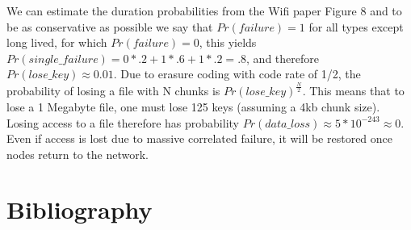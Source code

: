 \documentclass[a4paper,10pt]{article}
\begin{document}
We can estimate the duration probabilities from the Wifi paper Figure 8 
\cite{wifi} and to be as conservative as possible we say that $Pr(failure)=1$ 
for all types except long lived, for which $Pr(failure)=0$, this yields 
$Pr(single\_failure)= 0*.2 + 1*.6 + 1*.2 = .8$, and 
therefore $Pr(lose\_key) \approx 0.01$.  Due to erasure coding with code rate 
of 1/2, the probability of losing a file with N chunks is 
$Pr(lose\_key)^{\frac{N}{2}}$. 
This means that to lose a 1 Megabyte file, one must lose 125 keys (assuming a 
4kb chunk size). Losing access to a file therefore has probability 
$Pr(data\_loss) \approx 5*10^{-243} \approx 0$.  Even if access is lost due to 
massive correlated failure, it will be restored once nodes return to the 
network.

\pagebreak
\section{Bibliography}


\end{document}
